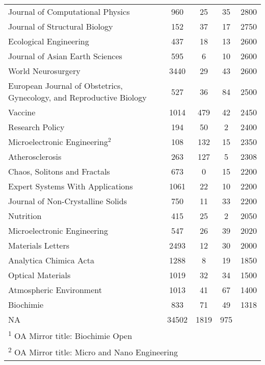 \documentclass[
  english,
  man]{apa6}
\begin{document}
\begin{table}
{\begin{tabular}[t]{lcccl}
Journal of Computational Physics & 960 & 25 & 35 & 2800\\
Journal of Structural Biology & 152 & 37 & 17 & 2750\\
Ecological Engineering & 437 & 18 & 13 & 2600\\
Journal of Asian Earth Sciences & 595 & 6 & 10 & 2600\\
World Neurosurgery & 3440 & 29 & 43 & 2600\\
European Journal of Obstetrics, Gynecology, and Reproductive Biology & 527 & 36 & 84 & 2500\\
Vaccine & 1014 & 479 & 42 & 2450\\
Research Policy & 194 & 50 & 2 & 2400\\
Microelectronic Engineering$^{2}$ & 108 & 132 & 15 & 2350\\
Atherosclerosis & 263 & 127 & 5 & 2308\\
Chaos, Solitons and Fractals & 673 & 0 & 15 & 2200\\
Expert Systems With Applications & 1061 & 22 & 10 & 2200\\
Journal of Non-Crystalline Solids & 750 & 11 & 33 & 2200\\
Nutrition & 415 & 25 & 2 & 2050\\
Microelectronic Engineering & 547 & 26 & 39 & 2020\\
Materials Letters & 2493 & 12 & 30 & 2000\\
Analytica Chimica Acta & 1288 & 8 & 19 & 1850\\
Optical Materials & 1019 & 32 & 34 & 1500\\
Atmospheric Environment & 1013 & 41 & 67 & 1400\\
Biochimie & 833 & 71 & 49 & 1318\\
NA & 34502 & 1819 & 975 & \\
\bottomrule
\multicolumn{5}{l}{\rule{0pt}{1em}\textsuperscript{1} OA Mirror title: Biochimie Open}\\
\multicolumn{5}{l}{\rule{0pt}{1em}\textsuperscript{2} OA Mirror title: Micro and Nano Engineering}\\
\end{tabular}}
\end{table}
\end{document}
